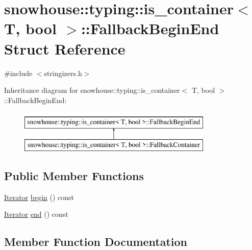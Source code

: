 \hypertarget{structsnowhouse_1_1typing_1_1is__container_1_1FallbackBeginEnd}{}\section{snowhouse\+::typing\+::is\+\_\+container$<$ T, bool $>$\+::Fallback\+Begin\+End Struct Reference}
\label{structsnowhouse_1_1typing_1_1is__container_1_1FallbackBeginEnd}


{\ttfamily \#include $<$stringizers.\+h$>$}

Inheritance diagram for snowhouse\+::typing\+::is\+\_\+container$<$ T, bool $>$\+::Fallback\+Begin\+End\+:\begin{figure}[H]
\begin{center}
\leavevmode
\includegraphics[height=2.000000cm]{structsnowhouse_1_1typing_1_1is__container_1_1FallbackBeginEnd}
\end{center}
\end{figure}
\subsection*{Public Member Functions}
\begin{DoxyCompactItemize}
\item 
\mbox{\hyperlink{structsnowhouse_1_1typing_1_1is__container_ac43487bbcd55fc7a2e4a2be11d4ae94c}{Iterator}} \mbox{\hyperlink{structsnowhouse_1_1typing_1_1is__container_1_1FallbackBeginEnd_a00b7192bb0c68e280de410fa43f5c536}{begin}} () const
\item 
\mbox{\hyperlink{structsnowhouse_1_1typing_1_1is__container_ac43487bbcd55fc7a2e4a2be11d4ae94c}{Iterator}} \mbox{\hyperlink{structsnowhouse_1_1typing_1_1is__container_1_1FallbackBeginEnd_a05d429bb082fa3996d2870d7149c4a39}{end}} () const
\end{DoxyCompactItemize}


\subsection{Member Function Documentation}
\mbox{\label{structsnowhouse_1_1typing_1_1is__container_1_1FallbackBeginEnd_a00b7192bb0c68e280de410fa43f5c536}} 
